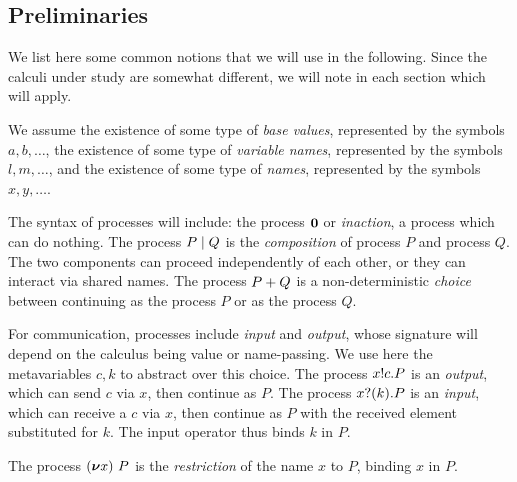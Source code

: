 \long{}
\newenvironment{metanote}{\begin{quote}\message{note!}[\begingroup\it}%
                         {\endgroup]\end{quote}}
\long{}

\subsection{Preliminaries}
\label{sec:prelim}

We list here some common notions that we will use in the following. Since the calculi under study are somewhat different, we will note in each section which will apply.

We assume the existence of some type of \emph{base values}, represented by the symbols
\( a, b, \dots \), the existence of some type
of \emph{variable names}, represented by the symbols
\( l, m, \dots \), and the existence of some type of \emph{names},
represented by the symbols \( x, y, \dots \).  %

The syntax of processes will include:
the process \( \bm{0} \) or \emph{inaction}, a process which can do nothing. The process \( P \mid Q \) is the \emph{composition} of process \( P \) and process \( Q \).
The two components can proceed independently of each other, or they can interact via shared names. The process \( P + Q \) is a non-deterministic \emph{choice} between continuing as the process \( P \) or as the process \( Q \).

For communication, processes include \emph{input} and \emph{output}, whose
signature will depend on the calculus being value or name-passing.
We use here the metavariables $c,k$ to abstract over this choice.
The process \( x ! c . P \) is an \emph{output}, which can send
\( c \) via \( x \), then continue as \( P \).  %
The process \( x ? (k) . P \) is an \emph{input}, which can receive a $c$
via \( x \), then continue as \( P \) with the received element
substituted for \( k \).  The input operator thus
binds \( k \) in \( P \).

The process \( (\bm{\nu} x)~P \) is the \emph{restriction} of the name
\( x \) to \( P \), binding \( x \) in \( P \).


